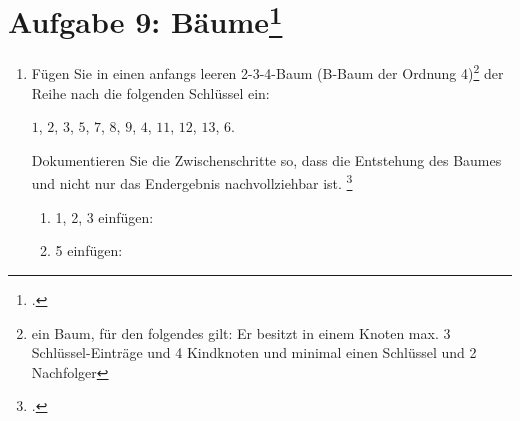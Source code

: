 \documentclass{lehramt-informatik}
\begin{document}
%

\section{Aufgabe 9: Bäume\footcite[entnommen aus Algorithmen und
Datenstrukturen, Übungsblatt 6, Universität Würzburg]{aud:pu:7}}

\begin{enumerate}


\item Fügen Sie in einen anfangs leeren 2-3-4-Baum (B-Baum der Ordnung
4)\footnote{ein Baum, für den folgendes gilt: Er besitzt in einem Knoten
max. 3 Schlüssel-Einträge und 4 Kindknoten und minimal einen Schlüssel
und 2 Nachfolger} der Reihe nach die folgenden Schlüssel ein:

\centerline{$1$, $2$, $3$, $5$, $7$, $8$, $9$, $4$, $11$, $12$, $13$, $6$.}

Dokumentieren Sie die Zwischenschritte so,
dass die Entstehung des Baumes und nicht nur das Endergebnis
nachvollziehbar ist. \footcite[Staatsexamen Theoretische Informatik,
Algorithmen und Datenstrukturen, Realschulen, Frühjahr 2011, Thema 1,
Aufgabe 3]{examen:46115:2011:03}

\begin{antwort}
\begin{multicols}{2}
\begin{enumerate}

%

\item 1, 2, 3 einfügen:


%

\item 5 einfügen:



\end{enumerate}
\end{multicols}
\end{antwort}
\end{enumerate}
\end{document}
